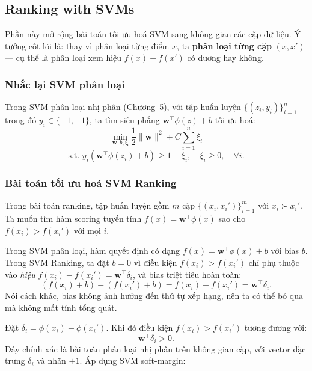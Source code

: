 \subsection{Ranking with SVMs}
\label{sec:svmranking}

Phần này mở rộng bài toán tối ưu hoá SVM sang không gian các cặp 
dữ liệu. Ý tưởng cốt lõi là: thay vì phân loại từng điểm $x$, 
ta \textbf{phân loại từng cặp} $(x, x')$ — cụ thể là phân loại 
xem hiệu $f(x) - f(x')$ có dương hay không.

\subsubsection{Nhắc lại SVM phân loại}

Trong SVM phân loại nhị phân (Chương~5), với tập huấn luyện 
$\{(z_i, y_i)\}_{i=1}^n$ trong đó $y_i \in \{-1, +1\}$, ta 
tìm siêu phẳng $\mathbf{w}^\top \phi(z) + b$ tối ưu hoá:
\[
  \min_{\mathbf{w}, b, \boldsymbol{\xi}} 
  \frac{1}{2}\|\mathbf{w}\|^2 + C\sum_{i=1}^n \xi_i
\]
\[
  \text{s.t. } y_i(\mathbf{w}^\top \phi(z_i) + b) \geq 1 - \xi_i, 
  \quad \xi_i \geq 0, \quad \forall i.
\]

\subsubsection{Bài toán tối ưu hoá SVM Ranking}

Trong bài toán ranking, tập huấn luyện gồm $m$ cặp 
$\{(x_i, x_i')\}_{i=1}^m$ với $x_i \succ x_i'$. Ta muốn 
tìm hàm scoring tuyến tính $f(x) = \mathbf{w}^\top \phi(x)$ 
sao cho $f(x_i) > f(x_i')$ với mọi $i$.

\begin{remark}
Trong SVM phân loại, hàm quyết định có dạng 
$f(x) = \mathbf{w}^\top\phi(x) + b$ với bias $b$. 
Trong SVM Ranking, ta đặt $b = 0$ vì điều kiện 
$f(x_i) > f(x_i')$ chỉ phụ thuộc vào 
\emph{hiệu} $f(x_i) - f(x_i') = \mathbf{w}^\top\delta_i$, 
và bias triệt tiêu hoàn toàn:
\[
  (f(x_i) + b) - (f(x_i') + b) 
  = f(x_i) - f(x_i') = \mathbf{w}^\top\delta_i.
\]
Nói cách khác, bias không ảnh hưởng đến thứ tự 
xếp hạng, nên ta có thể bỏ qua mà không mất tính 
tổng quát.
\end{remark}

Đặt $\delta_i = \phi(x_i) - \phi(x_i')$. Khi đó điều kiện 
$f(x_i) > f(x_i')$ tương đương với:
\[
  \mathbf{w}^\top \delta_i > 0.
\]
Đây chính xác là bài toán phân loại nhị phân trên không gian 
cặp, với vector đặc trưng $\delta_i$ và nhãn $+1$. Áp dụng 
SVM soft-margin:

